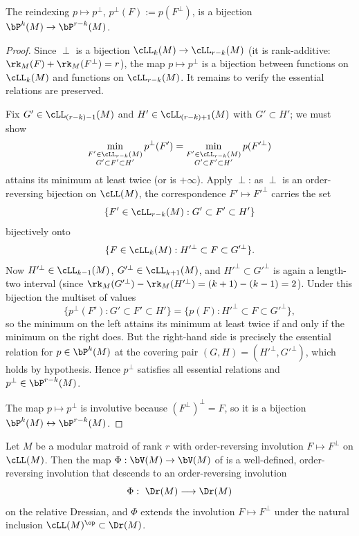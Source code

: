 \begin{lemma}\label{lem:perp-preserves-relations}
The reindexing $p\mapsto p^\perp$, $p^\perp(F):=p(F^\perp)$, is a bijection
$\bP^k(M)\to\bP^{r-k}(M)$.
\end{lemma}

\begin{proof}
Since $\perp$ is a bijection $\cLL_k(M)\to\cLL_{r-k}(M)$ (it is rank-additive:
$\rk_M(F)+\rk_M(F^\perp)=r$), the map $p\mapsto p^\perp$ is a bijection between
functions on $\cLL_k(M)$ and functions on $\cLL_{r-k}(M)$. It remains to verify
the essential relations are preserved.

Fix $G'\in\cLL_{(r-k)-1}(M)$ and $H'\in\cLL_{(r-k)+1}(M)$ with $G'\subset H'$;
we must show
\[
\min_{\substack{F'\in\cLL_{r-k}(M)\\ G'\subset F'\subset H'}} p^\perp(F')
=\min_{\substack{F'\in\cLL_{r-k}(M)\\ G'\subset F'\subset H'}} p(F'^{\perp})
\]
attains its minimum at least twice (or is $+\infty$). Apply $\perp$: as $\perp$
is an order-reversing bijection on $\cLL(M)$, the correspondence $F'\mapsto
F'^\perp$ carries the set
\[
\{F'\in\cLL_{r-k}(M): G'\subset F'\subset H'\}
\]
bijectively onto
\[
\{F\in\cLL_{k}(M): H'^{\perp}\subset F\subset G'^{\perp}\}.
\]
Now $H'^{\perp}\in\cLL_{k-1}(M)$, $G'^{\perp}\in\cLL_{k+1}(M)$, and
$H'^{\perp}\subset G'^{\perp}$ is again a length-two interval (since
$\rk_M(G'^\perp)-\rk_M(H'^\perp)= (k+1)-(k-1)=2$). Under this bijection the
multiset of values
\[
\{p^\perp(F'): G'\subset F'\subset H'\}=\{p(F): H'^\perp\subset F\subset G'^\perp\},
\]
so the minimum on the left attains its minimum at least twice if and only if the
minimum on the right does. But the right-hand side is precisely the essential
relation for $p\in\bP^k(M)$ at the covering pair
$(G,H)=(H'^{\perp},G'^{\perp})$, which holds by hypothesis. Hence $p^\perp$
satisfies all essential relations and $p^\perp\in\bP^{r-k}(M)$.

The map $p\mapsto p^\perp$ is involutive because $(F^\perp)^\perp=F$, so it is a
bijection $\bP^k(M)\leftrightarrow\bP^{r-k}(M)$.
\end{proof}

\begin{theorem}\label{thm:main}
Let $M$ be a modular matroid of rank $r$ with order-reversing involution
$F\mapsto F^\perp$ on $\cLL(M)$. Then the map $\Phi:\bV(M)\to\bV(M)$ of
 is a well-defined, order-reversing involution that descends to an
order-reversing involution
\[
\Phi:\ \Dr(M)\longrightarrow\Dr(M)
\]
on the relative Dressian, and $\Phi$ extends the involution
$F\mapsto F^\perp$ under the natural inclusion $\cLL(M)^{\op}\subset\Dr(M)$.
\end{theorem}


